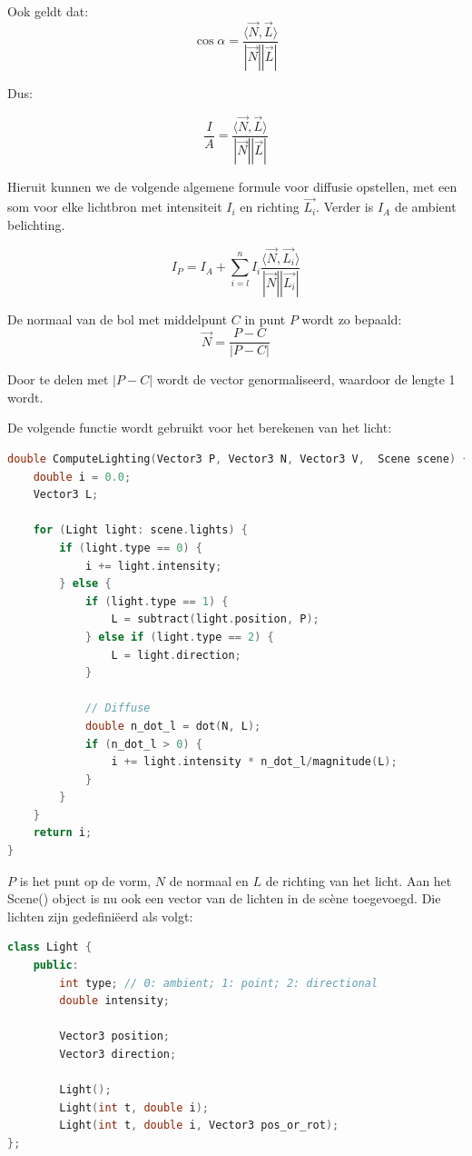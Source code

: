 \documentclass[12pt, a4paper]{article}
\begin{document}
Ook geldt dat:
\[\cos \alpha = \frac{\langle \overrightarrow{N},\overrightarrow{L}\rangle}{|\overrightarrow{N}||\overrightarrow{L}|}\]

Dus: 

\[\frac{I}{A} = \frac{\langle \overrightarrow{N},\overrightarrow{L}\rangle}{|\overrightarrow{N}||\overrightarrow{L}|}\]

Hieruit kunnen we de volgende algemene formule voor diffusie opstellen, met een som voor elke lichtbron met intensiteit $I_i$ en richting $\overrightarrow{L_i}$. Verder is $I_A$ de ambient belichting.

\[I_P=I_A+\sum_{i=l}^{n}I_i\frac{\langle \overrightarrow{N}, \overrightarrow{L_i} \rangle}{|\overrightarrow{N}||\overrightarrow{L_i}|}\]

De normaal van de bol met middelpunt $C$ in punt $P$ wordt zo bepaald:
\[\overrightarrow{N}=\frac{P-C}{|P-C|}\]

Door te delen met $|P-C|$ wordt de vector genormaliseerd, waardoor de lengte 1 wordt.

De volgende functie wordt gebruikt voor het berekenen van het licht:

\begin{lstlisting}[language=C++]
double ComputeLighting(Vector3 P, Vector3 N, Vector3 V,  Scene scene) {
    double i = 0.0;
    Vector3 L;

    for (Light light: scene.lights) {
        if (light.type == 0) {
            i += light.intensity;
        } else {
            if (light.type == 1) {
                L = subtract(light.position, P);
            } else if (light.type == 2) {
                L = light.direction;
            }

            // Diffuse
            double n_dot_l = dot(N, L);
            if (n_dot_l > 0) {
                i += light.intensity * n_dot_l/magnitude(L);
            }
        }
    }
    return i;
}
\end{lstlisting}

$P$ is het punt op de vorm, $N$ de normaal en $L$ de richting van het licht. Aan het Scene() object is nu ook een vector van de lichten in de scène toegevoegd. Die lichten zijn gedefiniëerd als volgt:

\begin{lstlisting}[language=C++]
class Light {
    public:
        int type; // 0: ambient; 1: point; 2: directional
        double intensity;

        Vector3 position;
        Vector3 direction;

        Light();
        Light(int t, double i);
        Light(int t, double i, Vector3 pos_or_rot);
};
\end{lstlisting}
\end{document}

